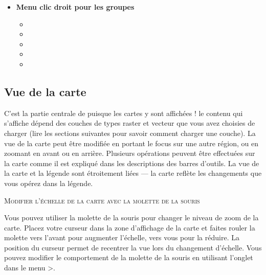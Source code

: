 \begin{itemize}[label=--]
\item \textbf{Menu clic droit pour les groupes} 
\begin{itemize}[label=--]
\item {}
\item {}
\item {}
\item {}
\item {}
\end{itemize}

\end{itemize}


\subsection{Vue de la carte} \label{label_mapview}

C'est la partie centrale de \qg puisque les cartes y sont affichées ! le contenu qui s'affiche dépend des couches de types raster et vecteur que vous avez choisies de charger (lire les sections suivantes pour savoir comment charger une couche). La vue de la carte peut être modifiée en portant le focus sur une autre région, ou en zoomant en avant ou en arrière. Plusieurs opérations peuvent être effectuées sur la carte comme il est expliqué dans les descriptions des barres d'outils. La vue de la carte et la légende sont étroitement liées — la carte reflète les changements que vous opérez dans la légende.

\begin{Tip} \caption{\textsc{Modifier l'échelle de la carte avec la molette de la souris} }
Vous pouvez utiliser la molette de la souris pour changer le niveau de zoom de la carte. Placez votre curseur dans la zone d'affichage de la carte et faites rouler la molette vers l'avant pour augmenter l'échelle, vers vous pour la réduire. La position du curseur permet de recentrer la vue lors du changement d'échelle. Vous pouvez modifier le comportement de la molette de la souris en utilisant l'onglet  dans le menu  >.
\end{Tip}

